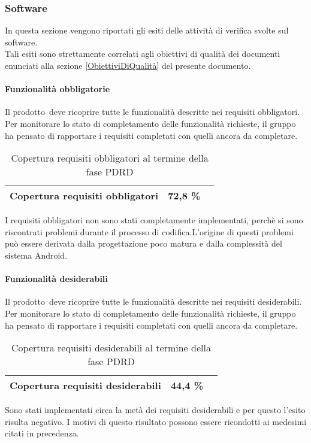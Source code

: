\documentclass[../PianoDiQualifica.tex]{subfiles}
\begin{document}
\begin{appendices}
			
		\subsubsection{Software}
		In questa sezione vengono riportati gli esiti delle attività di verifica svolte sul software.\\
		Tali esiti sono strettamente correlati agli obiettivi di qualità dei documenti enunciati alla sezione \ref{ObiettiviDiQualità} del presente documento.
		
			\paragraph{Funzionalità obbligatorie}
				Il prodotto\g\ deve ricoprire tutte le funzionalità descritte nei requisiti obbligatori. Per monitorare lo stato di completamento delle funzionalità richieste, il gruppo ha pensato di rapportare i requisiti completati con quelli ancora da completare.
				\begin{table}[H]
				\centering
				\begin{tabular}{l * {2}{c}}
					\midrule
					Copertura requisiti obbligatori & 72,8 \% \\
					\midrule
				\end{tabular}
				\caption{Copertura requisiti obbligatori al termine della fase PDRD}
				\label{tab:copertura_requisiti_obbligatori}
			\end{table}
			I requisiti obbligatori non sono stati completamente implementati, perchè si sono riscontrati problemi durante il processo di codifica.L'origine di questi problemi può essere derivata dalla progettazione poco matura e dalla complessità del sistema Android\g.  
			
			\paragraph{Funzionalità desiderabili}
				Il prodotto\g\ deve ricoprire tutte le funzionalità descritte nei requisiti desiderabili. Per monitorare lo stato di completamento delle funzionalità richieste, il gruppo ha pensato di rapportare i requisiti completati con quelli ancora da completare.
			\begin{table}[H]
				\centering
				\begin{tabular}{l * {2}{c}}
					\midrule
					Copertura requisiti desiderabili & 44,4 \% \\
					\midrule
				\end{tabular}
				\caption{Copertura requisiti desiderabili al termine della fase PDRD}
				\label{tab:copertura_requisiti_desiderabili}
			\end{table}
			Sono stati implementati circa la metà dei requisiti desiderabili e per questo l'esito risulta negativo. I motivi di questo risultato possono essere ricondotti ai medesimi citati in precedenza.
			

\end{appendices}
\end{document}
